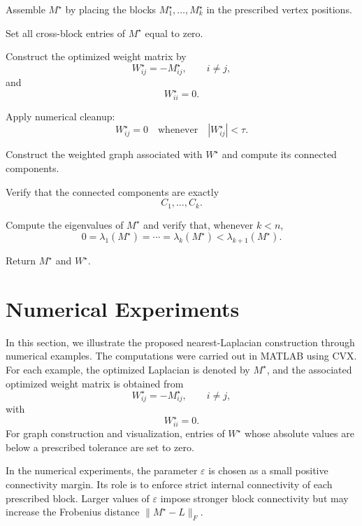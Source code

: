 \documentclass[11pt]{article}
\begin{document}
	
	\begin{algorithm}[H]
		\caption{Assembly and Verification of the Optimized Laplacian}
		\label{alg:assembly_verification}
		\DontPrintSemicolon
		\footnotesize
		
		
		Assemble $M^\star$ by placing the blocks $M_1^\star,\ldots,M_k^\star$ in the prescribed vertex positions.\;
		
		Set all cross-block entries of $M^\star$ equal to zero.\;
		
		Construct the optimized weight matrix by
		\[
		W^\star_{ij}=-M^\star_{ij},\qquad i\ne j,
		\]
		and
		\[
		W^\star_{ii}=0.
		\]
		
		Apply numerical cleanup:
		\[
		W^\star_{ij}=0
		\quad
		\text{whenever}
		\quad
		|W^\star_{ij}|<\tau.
		\]
		
		Construct the weighted graph associated with $W^\star$ and compute its connected components.\;
		
		Verify that the connected components are exactly
		\[
		C_1,\ldots,C_k.
		\]
		
		Compute the eigenvalues of $M^\star$ and verify that, whenever $k<n$,
		\[
		0=\lambda_1(M^\star)=\cdots=\lambda_k(M^\star)
		<
		\lambda_{k+1}(M^\star).
		\]
		
		Return $M^\star$ and $W^\star$.\;
		
	\end{algorithm}
	\FloatBarrier
	
	
\section{Numerical Experiments}

In this section, we illustrate the proposed nearest-Laplacian construction
through numerical examples. The computations were carried out in MATLAB using
CVX. For each example, the optimized Laplacian is denoted by $M^\star$, and
the associated optimized weight matrix is obtained from
\[
W^\star_{ij}=-M^\star_{ij},\qquad i\ne j,
\]
with
\[
W^\star_{ii}=0.
\]
For graph construction and visualization, entries of $W^\star$ whose absolute
values are below a prescribed tolerance are set to zero.

In the numerical experiments, the parameter $\varepsilon$ is chosen as a small
positive connectivity margin. Its role is to enforce strict internal
connectivity of each prescribed block. Larger values of $\varepsilon$ impose
stronger block connectivity but may increase the Frobenius distance
$\|M^\star-L\|_F$.\\
\end{document}
